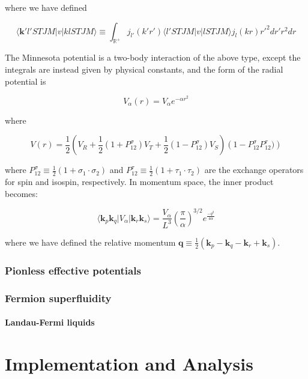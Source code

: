 \documentclass[10pt]{report}
\begin{document}
	where we have defined
	
	\begin{equation}
		\langle \bm{k}'l'STJM|v|klSTJM\rangle \equiv \int_{\mathbb{R}^+}j_{l'}(k'r') \langle l'STJM|v|lSTJM\rangle j_l(kr)r'^2 dr' r^2dr
	\end{equation}
	
	The Minnesota potential is a two-body interaction of the above type, except the integrals are instead given by physical constants, and the form of the radial potential is
	
	\begin{equation}
		V_\alpha(r) = V_\alpha e^{-\alpha r^2}
	\end{equation}
	
	where
	
	\begin{equation}
		V(r) = \frac{1}{2}\left( V_R + \frac{1}{2}(1+P_{12}^\sigma)V_T + \frac{1}{2}(1-P_{12}^\sigma)V_S\right)\left(1 - P_{12}^\sigma P_{12}^\tau)\right)
	\end{equation}
	
	where $P_{12}^\sigma \equiv \frac{1}{2}(1+\sigma_1\cdot\sigma_2)$ and $P_{12}^\tau \equiv \frac{1}{2}(1+\tau_1\cdot\tau_2)$ are the exchange operators for spin and isospin, respectively. In momentum space, the inner product becomes:
	
	\begin{equation}
		\langle \bm{k}_p\bm{k}_q|V_\alpha|\bm{k}_r\bm{k}_s\rangle = \frac{V_\alpha}{L^3}\left(\frac{\pi}{\alpha}\right)^{3/2}e^{\frac{-q^2}{4\alpha}}
	\end{equation}
	
	where we have defined the relative momentum $\bm{q} \equiv \frac{1}{2}(\bm{k}_p-\bm{k}_q-\bm{k}_r+\bm{k}_s)$.
	
	\section{Pionless effective potentials}
	
	\section{Fermion superfluidity}
	\subsection{Landau-Fermi liquids}
	
	\part{Implementation and Analysis}
	
\end{document}
